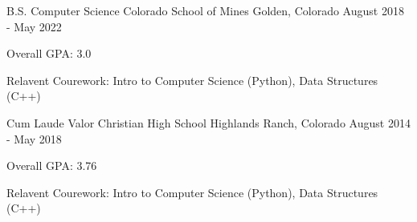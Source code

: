 

\begin{cventries}

  \cventry
    {B.S. Computer Science}
    {Colorado School of Mines} %
    {Golden, Colorado} %
    {August 2018 - May 2022} %
    {
      \begin{cvitems} %
        \item {Overall GPA: 3.0}
        \item {Relavent Courework: Intro to Computer Science (Python),
          Data Structures (C++)}
      \end{cvitems}
    }
    
  \cventry
    {Cum Laude}
    {Valor Christian High School} %
    {Highlands Ranch, Colorado} %
    {August 2014 - May 2018} %
    {
      \begin{cvitems} %
        \item {Overall GPA: 3.76}
        \item {Relavent Courework: Intro to Computer Science (Python),
          Data Structures (C++)}
      \end{cvitems}
    }

\end{cventries}
